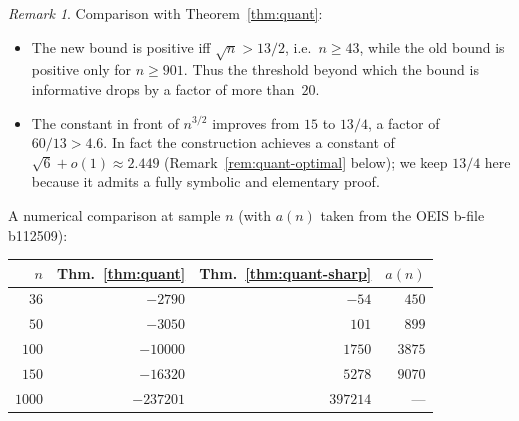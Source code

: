﻿\documentclass[11pt,a4paper]{article}
\theoremstyle{plain}
\theoremstyle{definition}
\theoremstyle{remark}
\newtheorem{remark}[theorem]{Remark}
\begin{document}
\begin{remark}\label{rem:quant-sharp-comparison}
Comparison with Theorem~\ref{thm:quant}:
\begin{itemize}[nosep]
  \item The new bound is positive iff $\sqrt n>13/2$, i.e.\ $n\ge 43$,
    while the old bound is positive only for $n\ge 901$.  Thus the
    threshold beyond which the bound is informative drops by a factor
    of more than~$20$.
  \item The constant in front of $n^{3/2}$ improves from $15$ to
    $13/4$, a factor of $60/13>4.6$.  In fact the construction
    achieves a constant of $\sqrt 6+o(1)\approx 2.449$
    (Remark~\ref{rem:quant-optimal} below); we keep $13/4$ here
    because it admits a fully symbolic and elementary proof.
\end{itemize}
A numerical comparison at sample $n$ (with $a(n)$ taken from
the OEIS b-file b112509):
\begin{center}\small
  \begin{tabular}{r r r r}
    \toprule
    $n$    & Thm.~\ref{thm:quant} & Thm.~\ref{thm:quant-sharp} & $a(n)$ \\
    \midrule
    $36$   & $-2790$   & $-54$   & $450$ \\
    $50$   & $-3050$   & $101$   & $899$ \\
    $100$  & $-10000$  & $1750$  & $3875$ \\
    $150$  & $-16320$  & $5278$  & $9070$ \\
    $1000$ & $-237201$ & $397214$ & --- \\
    \bottomrule
  \end{tabular}
\end{center}
\end{remark}
\end{document}
